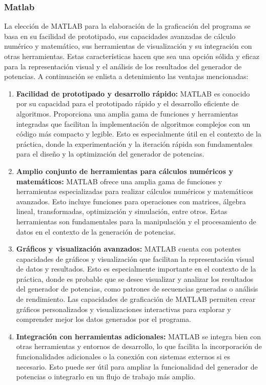 \documentclass{article}
\begin{document}
        \subsubsection{Matlab}
        La elección de MATLAB para la elaboración de la graficación del programa se basa en su facilidad de prototipado, sus capacidades
        avanzadas de cálculo numérico y matemático, sus herramientas de visualización y su integración con otras herramientas. Estas
        características hacen que sea una opción sólida y eficaz para la representación visual y el análisis de los resultados del
        generador de potencias. A continuación se enlista a detenimiento las ventajas mencionadas:

        \begin{enumerate}
            \item \textbf{Facilidad de prototipado y desarrollo rápido:} MATLAB es conocido por su capacidad para el prototipado rápido y
            el desarrollo eficiente de algoritmos. Proporciona una amplia gama de funciones y herramientas integradas que facilitan la
            implementación de algoritmos complejos con un código más compacto y legible. Esto es especialmente útil en el contexto de la
            práctica, donde la experimentación y la iteración rápida son fundamentales para el diseño y la optimización del generador de
            potencias.

            \item \textbf{Amplio conjunto de herramientas para cálculos numéricos y matemáticos:} MATLAB ofrece una amplia gama de
            funciones y herramientas especializadas para realizar cálculos numéricos y matemáticos avanzados. Esto incluye funciones para
            operaciones con matrices, álgebra lineal, transformadas, optimización y simulación, entre otros. Estas herramientas son
            fundamentales para la manipulación y el procesamiento de datos en el contexto de la generación de potencias.

            \item \textbf{Gráficos y visualización avanzados:} MATLAB cuenta con potentes capacidades de gráficos y visualización que
            facilitan la representación visual de datos y resultados. Esto es especialmente importante en el contexto de la práctica,
            donde es probable que se desee visualizar y analizar los resultados del generador de potencias, como patrones de secuencias
            generadas o análisis de rendimiento. Las capacidades de graficación de MATLAB permiten crear gráficos personalizados y
            visualizaciones interactivas para explorar y comprender mejor los datos generados por el programa.

            \item \textbf{Integración con herramientas adicionales:} MATLAB se integra bien con otras herramientas y entornos de desarrollo,
            lo que facilita la incorporación de funcionalidades adicionales o la conexión con sistemas externos si es necesario. Esto
            puede ser útil para ampliar la funcionalidad del generador de potencias o integrarlo en un flujo de trabajo más amplio.
        \end{enumerate}
\end{document}
